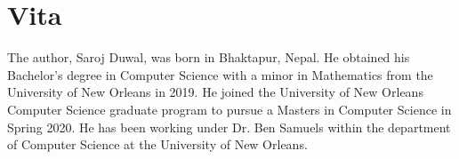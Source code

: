 
\chapter*{Vita}
The author, Saroj Duwal, was born in Bhaktapur, Nepal. He obtained his Bachelor's degree in Computer Science with a minor in Mathematics from the University of New Orleans in 2019. He joined the University of New Orleans Computer Science graduate program to pursue a Masters in Computer Science in Spring 2020. He has been working under Dr. Ben Samuels within the department of Computer Science at the University of New Orleans.